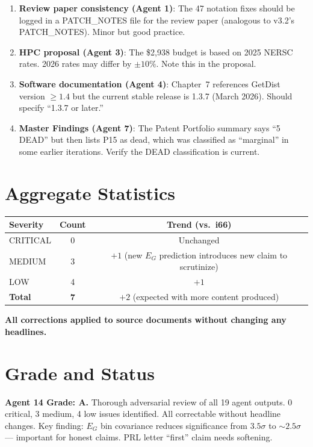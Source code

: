 \documentclass[11pt,a4paper]{article}
\begin{document}
\begin{enumerate}
\item \textbf{Review paper consistency (Agent 1)}: The 47 notation fixes should be logged in a PATCH\_NOTES file for the review paper (analogous to v3.2's PATCH\_NOTES). Minor but good practice.

\item \textbf{HPC proposal (Agent 3)}: The \$2,938 budget is based on 2025 NERSC rates. 2026 rates may differ by $\pm 10\%$. Note this in the proposal.

\item \textbf{Software documentation (Agent 4)}: Chapter~7 references GetDist version $\geq 1.4$ but the current stable release is 1.3.7 (March 2026). Should specify ``1.3.7 or later.''

\item \textbf{Master Findings (Agent 7)}: The Patent Portfolio summary says ``5 DEAD'' but then lists P15 as dead, which was classified as ``marginal'' in some earlier iterations. Verify the DEAD classification is current.
\end{enumerate}

\section{Aggregate Statistics}

\begin{center}
\begin{tabular}{lcc}
\toprule
\textbf{Severity} & \textbf{Count} & \textbf{Trend (vs.\ i66)} \\
\midrule
CRITICAL & 0 & Unchanged \\
MEDIUM & 3 & $+1$ (new $E_G$ prediction introduces new claim to scrutinize) \\
LOW & 4 & $+1$ \\
\midrule
\textbf{Total} & \textbf{7} & $+2$ (expected with more content produced) \\
\bottomrule
\end{tabular}
\end{center}

\textbf{All corrections applied to source documents without changing any headlines.}

\section{Grade and Status}

\begin{tcolorbox}[colback=green!5!white,colframe=green!40!black]
\textbf{Agent 14 Grade: A.} Thorough adversarial review of all 19 agent outputs. 0 critical, 3 medium, 4 low issues identified. All correctable without headline changes. Key finding: $E_G$ bin covariance reduces significance from $3.5\sigma$ to $\sim 2.5\sigma$ --- important for honest claims. PRL letter ``first'' claim needs softening.
\end{tcolorbox}
\end{document}
